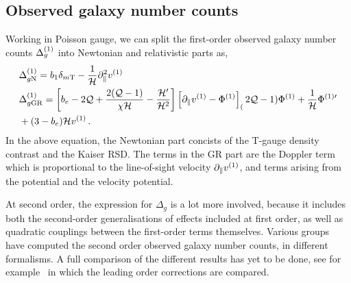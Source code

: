 \subsection{Observed galaxy number counts}
Working in Poisson gauge, we can split the first-order observed galaxy number counts $\Delta_g^{(1)}$ into Newtonian and relativistic parts as, 
\begin{align}
	&\Delta_{g\mathrm{N}}^{(1)} = b_1 \delta_{m\mathrm{T}} - \frac{1}{\mathcal{H}} \partial_\parallel^2 v^{(1)}\,\label{eq:DeltagNFO}\\
	&\Delta_{g\mathrm{GR}}^{(1)} = \left[ b_e - 2 \mathcal{Q} + \frac{2 (\mathcal{Q} - 1)}{\chi \mathcal{H}} - \frac{\mathcal{H}'}{\mathcal{H}^2} \right] \left[ \partial_\parallel v^{(1)} - \Phi^{(1)} \right] _ (2 \mathcal{Q} - 1) \Phi^{(1)} + \frac{1}{\mathcal{H}} \Phi^{{(1)} \prime} \nonumber \\
	& + (3 - b_e) \mathcal{H} v^{(1)}\,\label{eq:DeltagGRFO}.
\end{align}
In the above equation, the Newtonian part concists of the T-gauge density contrast and the Kaiser RSD. The terms in the GR part are the Doppler term which is proportional to the line-of-sight velocity $\partial_\parallel v^{(1)}$, and terms arising from the potential and the velocity potential. 

At second order, the expression for $\Delta_g$ is a lot more involved, because it includes both the second-order generalisations of effects included at first order, as well as quadratic couplings between the first-order terms themselves. Various groups have computed the second order observed galaxy number counts, in different formalisms. A full comparison of the different results has yet to be done, see for example~\cite{Fuentes:2020qby} in which the leading order corrections are compared.

